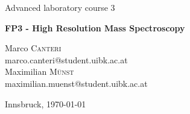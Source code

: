 \documentclass[a4paper,10pt]{article}
\begin{document}
\begin{titlepage}
 \begin{center}
	\Large{Advanced laboratory course 3}
	\end{center}
	\begin{center}
	 \LARGE{\textbf{FP3 - High Resolution Mass Spectroscopy}}
	\end{center}

	\begin{center}

	\large Marco \textsc{Canteri} \\
	marco.canteri@student.uibk.ac.at\\
	\large Maximilian \textsc{Münst} \\
	maximilian.muenst@student.uibk.ac.at
	\end{center}

	\begin{center}
	\vspace{1cm}
	Innsbruck, \today
	\vspace{1cm}
	\end{center}

	\begin{abstract}
		In the course of this experiment a high resolution long time measurement of the mass spectrum of Angiotensin was conducted using a FT-ICR mass spectrometer. Furthermore, fragments of CID collision were recorded over a collision energy range from \num{0} to \SI{20}{\electronvolt}. Finally, mass spectra of SORI-CID fragments were measured for several SORI-power settings. 
    \end{abstract}
    \vspace{1cm}


\end{titlepage}
\end{document}
